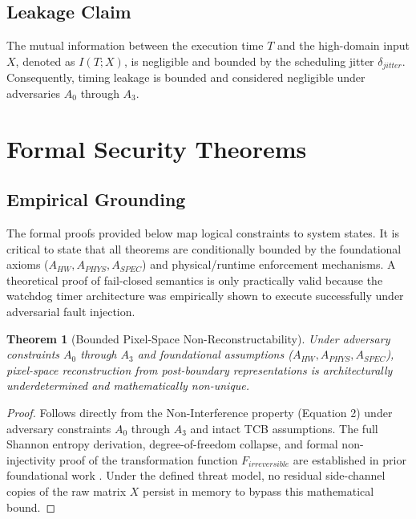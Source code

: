 \documentclass[conference]{IEEEtran}
\newtheorem{theorem}{Theorem}
\begin{document}
\subsection{Leakage Claim}
The mutual information between the execution time $T$ and the high-domain input $X$, denoted as $I(T; X)$, is negligible and bounded by the scheduling jitter $\delta_{jitter}$. Consequently, timing leakage is bounded and considered negligible under adversaries $A_0$ through $A_3$.

\section{Formal Security Theorems}

\subsection{Empirical Grounding}
The formal proofs provided below map logical constraints to system states. It is critical to state that all theorems are conditionally bounded by the foundational axioms ($A_{HW}, A_{PHYS}, A_{SPEC}$) and physical/runtime enforcement mechanisms. A theoretical proof of fail-closed semantics is only practically valid because the watchdog timer architecture was empirically shown to execute successfully under adversarial fault injection.

\begin{theorem}[Bounded Pixel-Space Non-Reconstructability]
Under adversary constraints $A_0$ through $A_3$ and foundational assumptions ($A_{HW}, A_{PHYS}, A_{SPEC}$), pixel-space reconstruction from post-boundary representations is architecturally underdetermined and mathematically non-unique.
\end{theorem}
\begin{proof}
Follows directly from the Non-Interference property (Equation 2) under adversary constraints $A_0$ through $A_3$ and intact TCB assumptions. The full Shannon entropy derivation, degree-of-freedom collapse, and formal non-injectivity proof of the transformation function $F_{irreversible}$ are established in prior foundational work \cite{b11}. Under the defined threat model, no residual side-channel copies of the raw matrix $X$ persist in memory to bypass this mathematical bound.
\end{proof}
\end{document}
